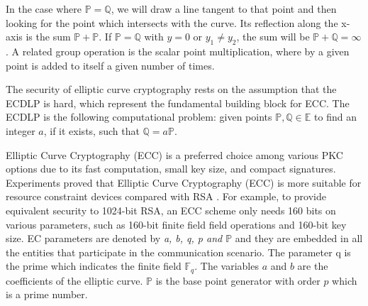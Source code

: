 In the case where $\mathbb{P} = \mathbb{Q}$, we will draw a line tangent to that point and then looking for the point which intersects with the curve. Its reflection along the x-axis is the sum $\mathbb{P} + \mathbb{P}$.
If $\mathbb{P} = \mathbb{Q}$ with $y=0$ or $y_1 \neq y_2$, the sum will be $\mathbb{P} + \mathbb{Q} = \infty$.
A related group operation is the scalar point multiplication, where by a given point is added to itself a given number of times.

The security of elliptic curve cryptography rests on the assumption that the \ac{ECDLP} is hard, which represent the fundamental building block for \acs{ECC}.
The ECDLP is the following computational problem:
given points $\mathbb{P}, \mathbb{Q} \in \mathbb{E}$ to find an integer $a$, if it exists, such that $\mathbb{Q} = a \mathbb{P}$.

Elliptic Curve Cryptography (ECC) is a preferred choice among various PKC options due to its fast computation, small key size, and compact signatures\cite{Research2000}. 
Experiments proved that Elliptic Curve Cryptography (ECC) is more suitable for resource constraint devices compared with RSA \cite{Gura2004}\cite{2005EnergyNetworks}.
For example, to provide equivalent security to 1024-bit RSA, an ECC scheme only needs 160 bits on various parameters, such as 160-bit finite field field operations and 160-bit key size\cite{Research2000}. 
EC parameters are denoted by \textit{a, b, q, p and $\mathbb{P}$} and they are embedded in all the entities that participate in the communication scenario. 
The parameter q is the prime which indicates the finite field $\mathbb{F}_q$. 
The variables $a$ and $b$ are the coefficients of the elliptic curve. 
$\mathbb{P}$ is the base point generator with order $p$ which is a  prime number.

